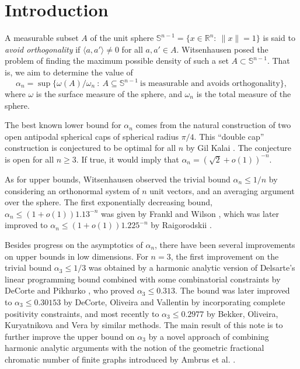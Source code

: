 \documentclass[11pt]{amsart}
\numberwithin{equation}{section}
\newcommand{\Sp}{\mathbb S}
\newcommand{\R}{\mathbb R}
\begin{document}
\maketitle

\section{Introduction}

A measurable subset $A$ of the unit sphere $\Sp^{n-1} = \{ x\in  \R^n : \ \|x\| = 1 \}$ is said to {\it avoid orthogonality} if $\langle a, a'\rangle \ne 0$ for all $a, a'\in A$.  Witsenhausen \cite{wits} posed the problem of finding the maximum possible density of such a set $A\subset \Sp^{n-1}$. That is, we aim to determine the value of
\begin{equation}\label{an}
\alpha_n = \sup \{ \omega(A)/\omega_n \ : \ A \subseteq \Sp^{n-1} \ \textrm{is \  measurable \ and \ avoids \ orthogonality}\},
\end{equation}
where $\omega$ is the surface measure of %
the sphere, and $\omega_n$ is the total measure of the sphere.

\medskip

The best known lower bound for $\alpha_n$ comes from the natural construction of two open antipodal spherical caps of spherical radius $\pi/4$. This 
``double cap'' construction is conjectured to be optimal for all $n$ by Gil Kalai \cite{kalai}. The conjecture is open for all $n\ge 3$. If true, it would imply that $\alpha_n=(\sqrt{2}+o(1))^{-n}$.

\medskip

As for upper bounds, Witsenhausen \cite{wits} observed the trivial bound $\alpha_n\le 1/n$ by considering an orthonormal  system of $n$ unit vectors, and an averaging argument over the sphere. The first exponentially decreasing bound, $\alpha_n\le (1+o(1))1.13^{-n}$ was given by Frankl and Wilson \cite{fs}, which was later improved  to $\alpha_n\le (1+o(1))1.225^{-n}$ by Raigorodskii \cite{rai}. 

\medskip

Besides progress on the asymptotics of $\alpha_n$, there have been several improvements on upper bounds in low dimensions. For $n=3$, the first improvement on the trivial bound $\alpha_3\le 1/3$ was obtained by a harmonic analytic version of Delsarte's linear programming bound combined with some combinatorial constraints by DeCorte and Pikhurko \cite{dp}, who proved $\alpha_3\le 0.313$. The bound was later improved to $\alpha_3\le 0.30153$ by DeCorte, Oliveira and Vallentin \cite{dov} by incorporating complete positivity constraints, and most recently to $\alpha_3\le 0.2977$ by Bekker, Oliveira, Kuryatnikova and Vera \cite{bekker} by similar methods. The main result of this note is to further improve the upper bound on $\alpha_3$ by a novel approach of combining  harmonic analytic arguments with the notion of the geometric fractional chromatic number of finite graphs introduced by Ambrus et al.  \cite{ambrus}. 
\end{document}
